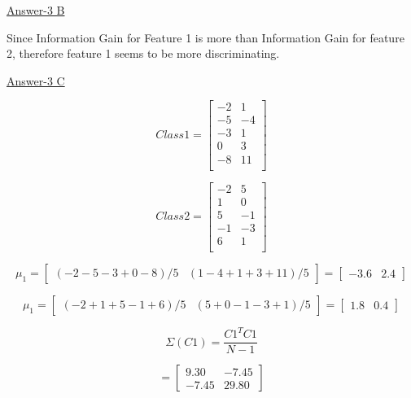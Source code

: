 \documentclass{report}
\begin{document}
\begin{flushleft}
\underline {Answer-3 B}  \linebreak[2]

Since Information Gain for Feature 1 is more than Information Gain for feature 2, therefore feature 1 seems to be more discriminating.  \linebreak[2]

\underline {Answer-3 C}  \linebreak[2]

\begin{equation} 
Class 1 = 
\begin{bmatrix}
-2 & 1 \\
-5 & -4 \\
-3 & 1 \\
0 &	3 \\
-8 & 11 \\
\end{bmatrix}
\end{equation}

\begin{equation} 
Class 2 = 
\begin{bmatrix}
-2 & 5 \\
1 & 0 \\
5 & -1 \\
-1 & -3 \\
6 & 1 \\
\end{bmatrix}
\end{equation}

\begin{equation}
\mu_1 = \begin{bmatrix}
(-2 -5 -3 + 0 -8)/5 & (1-4+1+3+11)/5 \end{bmatrix} = \begin{bmatrix}-3.6 & 2.4 \end{bmatrix}
\end{equation}

\begin{equation}
\mu_1 = \begin{bmatrix}
(-2 + 1 + 5 - 1 + 6)/5 & (5 + 0 - 1 - 3 + 1)/5 \end{bmatrix} = \begin{bmatrix}1.8 & 0.4 \end{bmatrix}
\end{equation}

\begin{equation}
\Sigma(C1) = \frac{C1^TC1}{N-1}  
\end{equation}

\[=\begin{bmatrix}
9.30 & -7.45 \\
-7.45 & 29.80
\end{bmatrix}\]


\end{flushleft}
\end{document}
